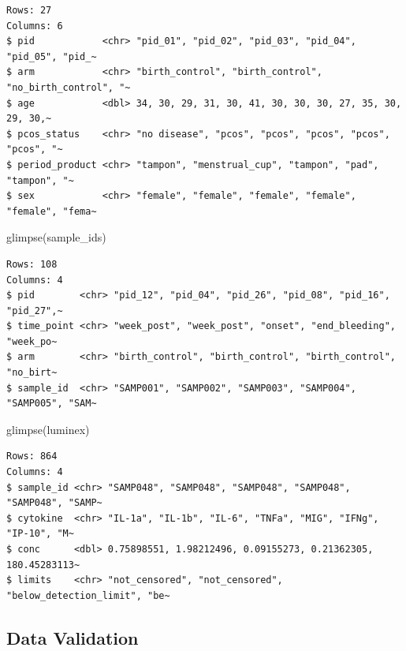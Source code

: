\documentclass[
  letterpaper,
  DIV=11,
  numbers=noendperiod]{scrartcl}
\newenvironment{Shaded}{\begin{snugshade}}{\end{snugshade}}
\newcommand{\CommentTok}[1]{\textcolor[rgb]{0.37,0.37,0.37}{#1}}
\newcommand{\FunctionTok}[1]{\textcolor[rgb]{0.28,0.35,0.67}{#1}}
\newcommand{\NormalTok}[1]{\textcolor[rgb]{0.00,0.23,0.31}{#1}}
\newcommand{\SpecialCharTok}[1]{\textcolor[rgb]{0.37,0.37,0.37}{#1}}
\newcommand{\StringTok}[1]{\textcolor[rgb]{0.13,0.47,0.30}{#1}}
\begin{document}
\begin{verbatim}
Rows: 27
Columns: 6
$ pid            <chr> "pid_01", "pid_02", "pid_03", "pid_04", "pid_05", "pid_~
$ arm            <chr> "birth_control", "birth_control", "no_birth_control", "~
$ age            <dbl> 34, 30, 29, 31, 30, 41, 30, 30, 30, 27, 35, 30, 29, 30,~
$ pcos_status    <chr> "no disease", "pcos", "pcos", "pcos", "pcos", "pcos", "~
$ period_product <chr> "tampon", "menstrual_cup", "tampon", "pad", "tampon", "~
$ sex            <chr> "female", "female", "female", "female", "female", "fema~
\end{verbatim}

\begin{Shaded}
\begin{Highlighting}[]
\FunctionTok{glimpse}\NormalTok{(sample\_ids)}
\end{Highlighting}
\end{Shaded}

\begin{verbatim}
Rows: 108
Columns: 4
$ pid        <chr> "pid_12", "pid_04", "pid_26", "pid_08", "pid_16", "pid_27",~
$ time_point <chr> "week_post", "week_post", "onset", "end_bleeding", "week_po~
$ arm        <chr> "birth_control", "birth_control", "birth_control", "no_birt~
$ sample_id  <chr> "SAMP001", "SAMP002", "SAMP003", "SAMP004", "SAMP005", "SAM~
\end{verbatim}

\begin{Shaded}
\begin{Highlighting}[]
\FunctionTok{glimpse}\NormalTok{(luminex)}
\end{Highlighting}
\end{Shaded}

\begin{verbatim}
Rows: 864
Columns: 4
$ sample_id <chr> "SAMP048", "SAMP048", "SAMP048", "SAMP048", "SAMP048", "SAMP~
$ cytokine  <chr> "IL-1a", "IL-1b", "IL-6", "TNFa", "MIG", "IFNg", "IP-10", "M~
$ conc      <dbl> 0.75898551, 1.98212496, 0.09155273, 0.21362305, 180.45283113~
$ limits    <chr> "not_censored", "not_censored", "below_detection_limit", "be~
\end{verbatim}

\subsection{Data Validation}\label{data-validation}

\begin{Shaded}
\end{Shaded}
\end{document}
